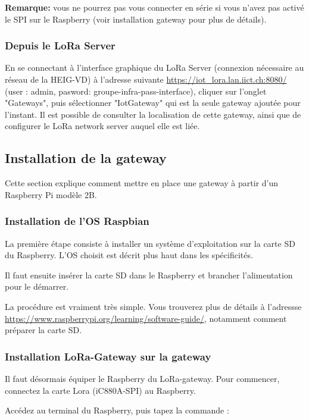 \textbf{Remarque:} vous ne pourrez pas vous connecter en série si vous n'avez pas activé le SPI sur le Raspberry (voir installation gateway pour plus de détails).

\subsubsection{Depuis le LoRa Server}

En se connectant à l'interface graphique du LoRa Server (connexion nécessaire au réseau de la HEIG-VD) à l'adresse suivante \url{https://iot_lora.lan.iict.ch:8080/} (user : admin, pasword: groupe-infra-pass-interface), cliquer sur l'onglet "Gateways", puis sélectionner "IotGateway" qui est la seule gateway ajoutée pour l'instant. Il est possible de consulter la localisation de cette gateway, ainsi que de configurer le LoRa network server auquel elle est liée.

\subsection{Installation de la gateway}

Cette section explique comment mettre en place une gateway à partir d'un Raspberry Pi modèle 2B.

\subsubsection{Installation de l'OS Raspbian}

La première étape consiste à installer un système d'exploitation sur la carte SD du Raspberry. L'OS choisit est décrit plus haut dans les spécificités.

Il faut ensuite insérer la carte SD dans le Raspberry et brancher l'alimentation pour le démarrer.

La procédure est vraiment très simple. Vous trouverez plus de détails à l'adressse \url{https://www.raspberrypi.org/learning/software-guide/}, notamment comment préparer la carte SD.

\subsubsection{Installation LoRa-Gateway sur la gateway}

Il faut désormais équiper le Raspberry du LoRa-gateway. Pour commencer, connectez la carte Lora (iC880A-SPI) au Raspberry.

Accédez au terminal du Raspberry, puis tapez la commande :

